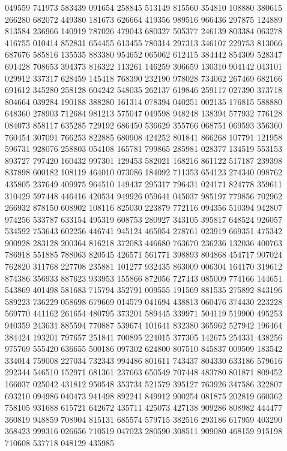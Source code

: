 {049559 741973 583439 091654 258845 513149 815560 354810 108880 380615 266280%
682072 449380 181673 626664 419356 989516 966436 297875 124889 813584 236966%
140919 787026 479043 680327 505377 246139 803384 063278 416755 010414 852831%
654455 613455 780314 297313 346107 229753 813066 687676 585816 135535 883380%
954652 065062 612415 384442 854309 528347 691428 708653 394373 816322 113261%
146259 306659 130310 904142 043101 029912 337317 628459 145418 768390 232190%
978028 734062 267469 682166 691612 345280 258128 604242 548035 262137 619846%
259117 027390 373718 804664 039284 190188 388280 161314 078394 040251 002135%
176815 588880 648360 278903 712684 981213 575047 049598 948248 138394 577932%
776128 084073 858117 635285 729192 686450 536629 355766 068751 069593 356360%
760454 307091 766253 822885 680908 424252 801841 866268 107791 121958 596731%
928076 258803 054108 165781 799865 285981 028377 134519 553153 893727 797420%
160432 997301 129453 582021 168216 861122 517187 239398 837898 600182 108119%
464010 073086 184092 711353 654123 274340 098762 435805 237649 409975 964510%
149437 295317 796431 024171 824778 359611 310429 597448 446416 420534 949926%
059641 045037 985197 779856 702962 266932 878150 608902 108116 825030 223879%
772116 094356 510394 942807 974256 533787 633154 495319 608753 280927 343105%
395817 648524 926057 534592 753643 602256 446741 945124 465054 278761 023919%
669351 475342 900928 283128 200364 816218 372083 446680 763670 236236 132036%
400763 786918 551885 788063 820545 426571 561771 398893 804868 454717 907024%
762820 311768 227708 235881 101277 932435 863009 006304 164170 319612 874386%
356933 887623 933953 155866 872056 727443 085009 774166 144651 543869 401498%
581683 715794 352791 009555 191569 881535 275892 843196 589223 736229 058698%
679669 014579 041694 438813 060476 374430 223228 569770 441162 261654 480795%
373201 589445 339971 504119 519900 495253 940359 243631 885594 770887 539674%
101641 832380 365962 527942 196464 384424 193201 797657 251841 700895 224015%
377305 142675 254331 438256 975769 555420 636655 500186 097302 624800 807510%
845837 009509 183542 334014 759008 227034 732343 994486 801611 743437 804330%
633186 579616 292344 546510 152971 681361 237663 650549 707448 483780 801871%
809452 166037 025042 431812 950548 353734 521579 395127 763926 347586 322807%
693210 094986 040473 941498 892241 849912 900254 081875 202819 660362 758105%
931688 615721 642672 435711 425073 427138 909286 808982 444477 360819 948859%
708904 815131 685574 579715 382516 293186 617959 403290 368423 999316 026656%
710519 047023 280590 308511 909080 468159 915198 710608 537718 048129 435985%
}

